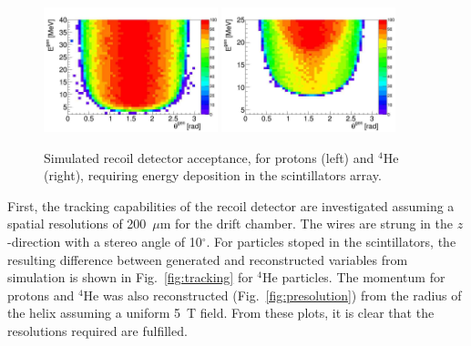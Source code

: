 \begin{figure}[ht!]
    \begin{center}
        \includegraphics[width=0.45\textwidth]{./../Detector/fig-chap2/Bare_3atm_1atm_Proton_Acceptance}
        \includegraphics[width=0.45\textwidth]{./../Detector/fig-chap2/Bare_3atm_1atm_Alpha_Acceptance}
        \caption{Simulated recoil detector acceptance, for protons (left) and $^4$He (right), requiring energy deposition in the scintillators array. \label{fig:acceptance}}
    \end{center}
\end{figure}

First, the tracking capabilities of the recoil detector are investigated 
assuming a spatial resolutions of 200~$\mu$m for the drift chamber. The wires 
are strung in the $z$-direction with a stereo angle of 10$^\circ$. For 
particles stoped in the scintillators, the resulting difference between 
generated and reconstructed variables from simulation is shown in 
Fig.~\ref{fig:tracking} for $^4$He particles. The momentum for protons and 
$^4$He was also reconstructed (Fig.~\ref{fig:presolution}) from the radius of 
the helix assuming a uniform 5~T field. From these plots, it is clear that the 
resolutions required are fulfilled. \\

